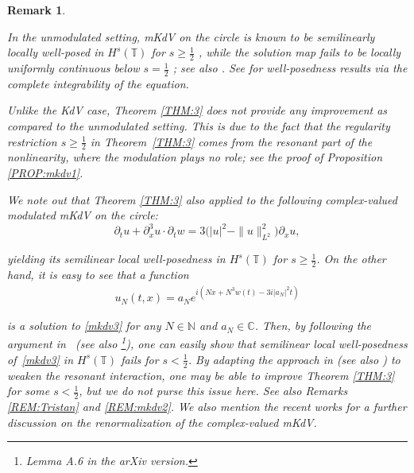 \documentclass[letterpaper, 11pt,  reqno]{amsart}
\newtheorem{remark}[theorem]{Remark}
\newcommand{\1}{\hspace{0.5mm}\text{I}\hspace{0.5mm}}
\newcommand{\noi}{\noindent}
\newcommand{\C}{\mathbb{C}}
\newcommand{\T}{\mathbb{T}}
\newcommand{\dx}{\partial_x}
\newcommand{\dt}{\partial_t}
\newcommand{\N}{\mathbb{N}}
\numberwithin{equation}{section}
\numberwithin{theorem}{section}
\begin{document}
\begin{remark}\label{REM:mkdv1}\rm

In the unmodulated setting, 
mKdV on the circle is known to be semilinearly locally well-posed in 
$H^s(\T)$ for $s \ge \frac 12$
\cite{BO93, KO}, 
while 
 the solution map
fails to be locally 
uniformly continuous below $s = \frac 12$
\cite{CCT, TT}; see also \cite{BO97}.
See \cite{KT2, Forlano}
for well-posedness results via the complete integrability of the equation.

Unlike the KdV case, 
Theorem \ref{THM:3}
does not provide any improvement as compared to the unmodulated setting.
This is due to the fact that 
the regularity restriction $s \ge \frac 12$  in Theorem~\ref{THM:3}
comes from  the resonant part of the nonlinearity, 
where the modulation plays no role;
see the proof of Proposition \ref{PROP:mkdv1}.


We note out that
Theorem \ref{THM:3}
also applied to the following
complex-valued modulated mKdV on the circle:
\begin{equation}
\label{mkdv3}
\dt u+   \dx^3 u \cdot \dt w=3   \big(|u|^2- \|u\|_{L^2}^2\big)\dx u, 
\end{equation}

\noi
yielding its semilinear local well-posedness in $H^s(\T)$ for $s \ge \frac 12$.
On the other hand, 
it is easy to see that a function 
\begin{align*}
 u_N(t, x) = a_N e^{i (Nx + N^3 w(t) - 3i |a_N|^2 t)}
\end{align*}

\noi
is a solution to \eqref{mkdv3} for any $N \in \N$ and $a_N \in \C$.
Then, 
by following the argument in~\cite{BGT}
(see also \cite[Lemma 6.16]{OTz}\footnote{Lemma A.6 in the arXiv version.}), 
one can easily show that semilinear local well-posedness
of~\eqref{mkdv3}
in $H^s(\T)$
fails for $s < \frac 12$.
By adapting  the approach in  \cite{TT, NTT}
(see also \cite{OTzW, BLLZ})
to weaken the resonant interaction,
one may be able to improve Theorem \ref{THM:3} for some $s  < \frac 12$, 
but we do not purse this issue here.
See also Remarks \ref{REM:Tristan} and \ref{REM:mkdv2}.
We also mention the recent works
 \cite{C1, C2}
for a further discussion on the renormalization of the complex-valued mKdV.


\end{remark}


\end{document}

